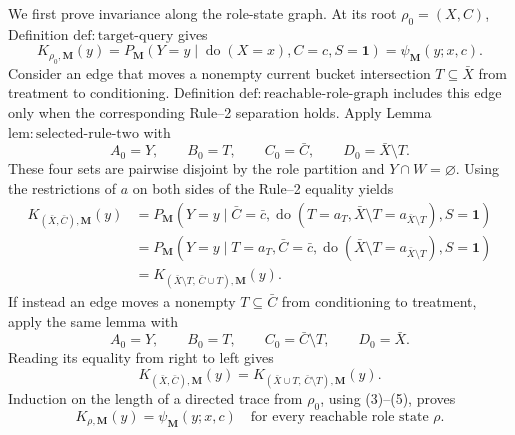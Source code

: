 We first prove invariance along the role-state graph.  At its root \(\rho_0=(X,C)\), Definition \(\mathrm{def{:}target\text{-}query}\) gives
\[
 K_{\rho_0,\mathbf M}(y)
 =P_{\mathbf M}(Y=y\mid\operatorname{do}(X=x),C=c,S=\mathbf 1)
 =\psi_{\mathbf M}(y;x,c).
 \tag{3}
\]
Consider an edge that moves a nonempty current bucket intersection \(T\subseteq\bar X\) from treatment to conditioning.  Definition \(\mathrm{def{:}reachable\text{-}role\text{-}graph}\) includes this edge only when the corresponding Rule--2 separation holds.  Apply Lemma \(\mathrm{lem{:}selected\text{-}rule\text{-}two}\) with
\[
 A_0=Y,\qquad B_0=T,\qquad C_0=\bar C,
 \qquad D_0=\bar X\setminus T.
\]
These four sets are pairwise disjoint by the role partition and \(Y\cap W=\varnothing\).  Using the restrictions of \(a\) on both sides of the Rule--2 equality yields
\[
\begin{aligned}
 K_{(\bar X,\bar C),\mathbf M}(y)
 &=P_{\mathbf M}\!\left(
 Y=y\mid \bar C=\bar c,
 \operatorname{do}(T=a_T,\bar X\setminus T=a_{\bar X\setminus T}),
 S=\mathbf 1\right)\\
 &=P_{\mathbf M}\!\left(
 Y=y\mid T=a_T,\bar C=\bar c,
 \operatorname{do}(\bar X\setminus T=a_{\bar X\setminus T}),
 S=\mathbf 1\right)\\
 &=K_{(\bar X\setminus T,\,\bar C\cup T),\mathbf M}(y).
\end{aligned}
\tag{4}
\]
If instead an edge moves a nonempty \(T\subseteq\bar C\) from conditioning to treatment, apply the same lemma with
\[
 A_0=Y,\qquad B_0=T,\qquad C_0=\bar C\setminus T,
 \qquad D_0=\bar X.
\]
Reading its equality from right to left gives
\[
 K_{(\bar X,\bar C),\mathbf M}(y)
 =K_{(\bar X\cup T,\,\bar C\setminus T),\mathbf M}(y).
 \tag{5}
\]
Induction on the length of a directed trace from \(\rho_0\), using (3)--(5), proves
\[
 K_{\rho,\mathbf M}(y)=\psi_{\mathbf M}(y;x,c)
 \quad\text{for every reachable role state }\rho.
 \tag{6}
\]


